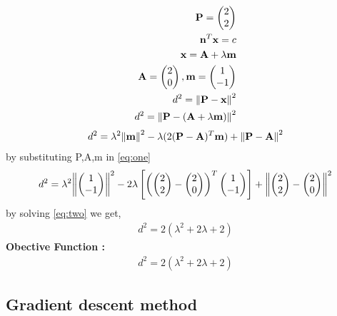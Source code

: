 \documentclass[10pt, a4paper]{article}
\newcommand{\myvec}[1]{\ensuremath{\begin{pmatrix}#1\end{pmatrix}}}
\let\vec\mathbf
\begin{document}
\begin{align}
\vec{P} = \myvec{2\\2}\\
\vec{n}^T\vec{x}=c\\
\vec{x}=\vec{A}+\lambda \vec{m}\\
\vec{A} = \myvec{2\\0}, \vec{m} = \myvec{1\\-1}\\
d^2 = \norm{\vec{P}-\vec{x}}^2\\
d^2 = \norm{\vec{P}-(\vec{A}+\lambda \vec{m})}^2
\end{align}
\begin{align}
	\label{eq:one}
	d^2 = \lambda^2\norm{\vec{m}}^2-\lambda(2(\vec{P}-\vec{A})^T\vec{m})+\norm{\vec{P}-\vec{A}}^2
	\end{align}
by substituting P,A,m in \eqref{eq:one}
\begin{align}
	\label{eq:two}
	d^2 = \lambda^2\norm{\myvec{1\\-1}}^2-2\lambda\left[\left (\myvec{2\\2}-\myvec{2\\0}\right)^T\myvec{1\\-1}\right]
+\norm{\myvec{2\\2}-\myvec{2\\0}}^2
	\end{align}
	by solving \eqref{eq:two} we get,
\begin{align}
d^2=2(\lambda^2+2\lambda+2)
\end{align}
\textbf{Obective Function :}
\begin{align}
d^2=2(\lambda^2+2\lambda+2)
\end{align}

    \subsection*{\normalsize Gradient descent method}
    
\end{document}
